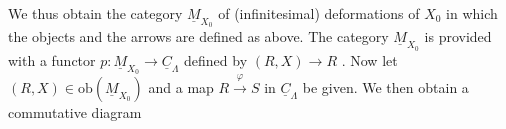 \begin{center}
\end{center}
We thus obtain the category $\underline{M}_{X_0}$ of (infinitesimal) deformations of $X_0$ in which the objects and the arrows are defined as above. The category $\underline{M}_{X_0}$ is provided with a functor $p : \underline{M}_{X_0} \to \underline{C}_\Lambda$ defined by $(R, X) \to R$ . Now let $(R, X) \in \mathrm{ob}(\underline{M}_{X_0})$ and a map $R \xrightarrow{\ \varphi\ } S$ in $\underline{C}_\Lambda$ be given. We then obtain a commutative diagram

